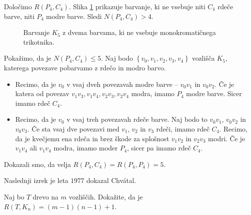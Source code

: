 \documentclass[twoside,11pt]{article}
\providecommand{\set}[1]{\left\{#1\right\}}
\begin{document}
\begin{zgled}
    Določimo $R(P_4, C_4)$.
    Slika \ref{fig:p4c4} prikazuje barvanje, ki ne vsebuje niti $C_4$ rdeče 
    barve, niti $P_4$ modre barve. Sledi $N(P_4,C_4) > 4$.

    \begin{figure}[h!]
        \centering
        \newcommand\size{1}
        \caption{Barvanje $K_{5}$ z dvema barvama, ki ne vsebuje monokromatičnega trikotnika.}
        \label{fig:p4c4}
    \end{figure}

    Pokažimo, da je $N(P_4, C_4) \le 5$. Naj bodo $\set{v_0, v_1, v_2, v_3, v_4}$ vozlišča
    $K_5$, katerega povezave pobarvamo z rdečo in modro barvo.
    \begin{itemize}
        \item Recimo, da je $v_0$ v vsaj dveh povezavah modre barve -- $v_0v_1$ in $v_0v_2$. Če je
        katera od povezav $v_1v_3, v_1v_4, v_2v_3, v_2v_4$ modra, imamo $P_4$ modre barve.
        Sicer imamo rdeč $C_4$.

        \item Recimo, da je $v_0$ v vsaj treh povezavah rdeče barve. Naj bodo to $v_0v_1$, $v_0v_2$
        in $v_0v_3$. Če sta vsaj dve povezavi med $v_1$, $v_2$ in $v_3$ rdeči, imamo 
        rdeč $C_4$. Recimo, da je kvečjemu ena rdeča in brez škode za splošnost $v_1v_2$ in $v_2v_3$ 
        modri. Če je $v_1v_4$ ali $v_1v_4$ modra, imamo moder $P_4$, sicer pa imamo rdeč $C_4$.
    \end{itemize}

    Dokazali smo, da velja $R(P_4, C_4) = R(P_4, P_4) = 5$.
\end{zgled}

Naslednji izrek je leta $1977$ dokazal Chvátal.

\begin{izrek}[Chvátal]
    Naj bo $T$ drevo na $m$ vozliščih. Dokažite, da je $R(T, K_n) = (m-1)(n-1)+1$.    
\end{izrek}
\end{document}
